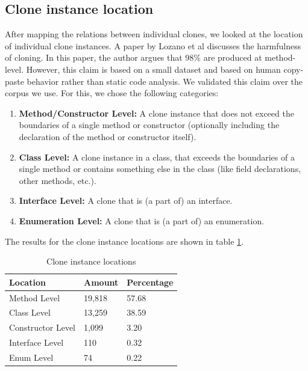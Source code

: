 \documentclass[a4paper]{article}
\begin{document}
\subsection{Clone instance location}
After mapping the relations between individual clones, we looked at the location of individual clone instances. A paper by Lozano et al \cite{lozano2007evaluating} discusses the harmfulness of cloning. In this paper, the author argues that 98\% are produced at method-level. However, this claim is based on a small dataset and based on human copy-paste behavior rather than static code analysis. We validated this claim over the corpus we use. For this, we chose the following categories:
\begin{enumerate}
  \item \textbf{Method/Constructor Level:} A clone instance that does not exceed the boundaries of a single method or constructor (optionally including the declaration of the method or constructor itself).
  \item \textbf{Class Level:} A clone instance in a class, that exceeds the boundaries of a single method or contains something else in the class (like field declarations, other methods, etc.).
  \item \textbf{Interface Level:} A clone that is (a part of) an interface.
  \item \textbf{Enumeration Level:} A clone that is (a part of) an enumeration.
\end{enumerate}

The results for the clone instance locations are shown in table \ref{table:locations}.

\begin{table}[H]
  \begin{center}
  \caption{Clone instance locations} \label{table:locations}
  \bigskip
\begin{tabular}{|l|l|l|}
\hline
\textbf{Location}  & \textbf{Amount}  & \textbf{Percentage} \\ \hline
Method Level       & 19,818           & 57.68               \\ \hline
Class Level        & 13,259           & 38.59               \\ \hline
Constructor Level  & 1,099            & 3.20                \\ \hline
Interface Level    & 110              & 0.32                \\ \hline
Enum Level         & 74               & 0.22                \\ \hline
\end{tabular}
\end{center}
\end{table}
\end{document}
